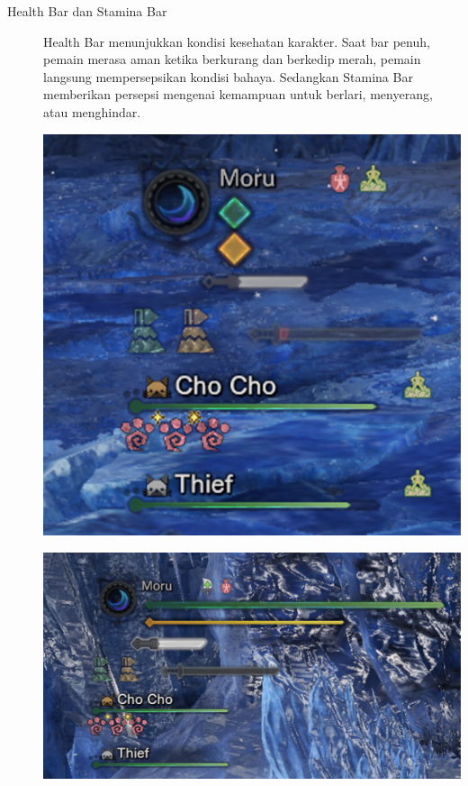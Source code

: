 \documentclass[12pt]{article}
\begin{document}
\begin{description}
    \item[Health Bar dan Stamina Bar] 
    Health Bar menunjukkan kondisi kesehatan karakter. Saat bar penuh, pemain merasa aman ketika berkurang dan berkedip merah, pemain langsung mempersepsikan kondisi bahaya. 
    Sedangkan Stamina Bar memberikan persepsi mengenai kemampuan untuk berlari, menyerang, atau menghindar.

    \begin{center}
    \begin{minipage}{0.45\textwidth}
        \centering
        \includegraphics[width=\textwidth]{Image/HUD_Details/HP_Minimized.png}
    \end{minipage}
    \hfill
    \begin{minipage}{0.45\textwidth}
        \centering
        \includegraphics[width=\textwidth]{Image/HUD_Details/HP_Maximize.png}
    \end{minipage}
    \end{center}
    \vspace{0.3cm}


\end{description}
\end{document}
